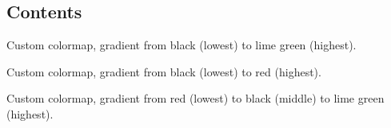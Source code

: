 \documentclass[letterpaper,10pt,english]{sphinxmanual}
\begin{document}
\subsection{Contents}
\label{\detokenize{plots:contents}}

\begin{fulllineitems}
\label{\detokenize{plots:data_tools.plots.cmap_bkgr}}
Custom colormap, gradient from black (lowest) to lime green (highest).

\end{fulllineitems}


\begin{fulllineitems}
\label{\detokenize{plots:data_tools.plots.cmap_bkrd}}
Custom colormap, gradient from black (lowest) to red (highest).

\end{fulllineitems}


\begin{fulllineitems}
\label{\detokenize{plots:data_tools.plots.cmap_rdbkgr}}
Custom colormap, gradient from red (lowest) to black (middle) to lime
green (highest).

\end{fulllineitems}

\end{document}

